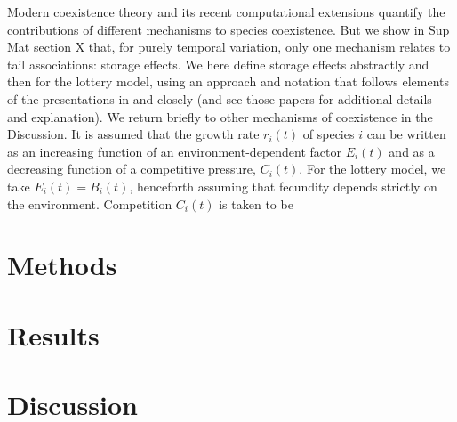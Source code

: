 \documentclass[letterpaper,11pt]{article}\usepackage[]{graphicx}\usepackage[]{color}
\begin{document}
Modern coexistence theory \citep{Chesson_2000} and its recent computational extensions \citep{Ellner_2016,Ellner_2019} 
quantify the contributions of 
different mechanisms to species coexistence. But we show in Sup Mat section X
that, for purely temporal variation, only one mechanism relates to tail associations: storage effects. 
We here define storage effects abstractly and then for the lottery model, using an approach and notation
that follows elements of the presentations in \cite{Ellner_2016} and \cite{Ellner_2019} closely (and see
those papers for additional details and explanation). We 
return briefly to other mechanisms of coexistence in the Discussion.
It is assumed that the growth rate $r_i(t)$ of species $i$ can be written as an increasing function of
an environment-dependent factor $E_i(t)$ and as a decreasing function of a competitive pressure, $C_i(t)$.
For the lottery model, we take $E_i(t)=B_i(t)$, henceforth assuming that fecundity depends strictly on
the environment. Competition $C_i(t)$ is taken to be 


\section{Methods}\label{section:methods}


\section{Results}\label{section:results}


\section{Discussion}\label{section:discussion}


\clearpage
\newpage



\end{document}
